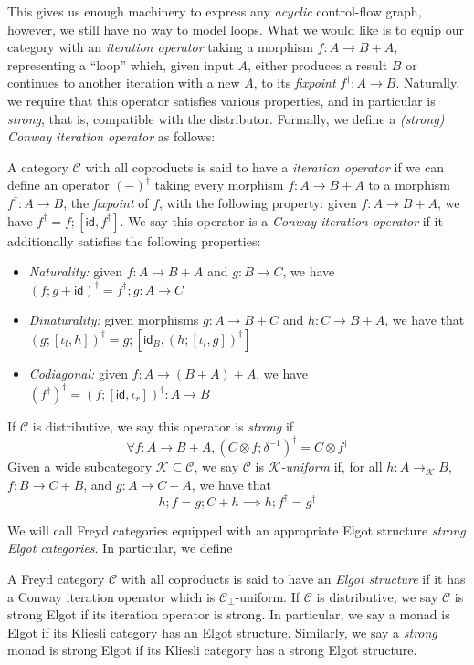 \documentclass[acmsmall,screen,review]{acmart}
\newcommand{\mc}[1]{\ensuremath{\mathcal{#1}}}
\newcommand{\ms}[1]{\ensuremath{\mathsf{#1}}}
\begin{document}
This gives us enough machinery to express any \emph{acyclic} control-flow graph, however, we still
have no way to model loops. What we would like is to equip our category with an \emph{iteration
operator} taking a morphism $f: A \to B + A$, representing a ``loop'' which, given input $A$, either
produces a result $B$ or continues to another iteration with a new $A$, to its \emph{fixpoint}
$f^\dagger: A \to B$. Naturally, we require that this operator satisfies various properties, and in
particular is \emph{strong}, that is, compatible with the distributor. Formally, we define a
\emph{(strong) Conway iteration operator} as follows:
\begin{definition}
  A category $\mc{C}$ with all coproducts is said to have a \emph{iteration operator} if we can
  define an operator $(-)^\dagger$ taking every morphism $f : A \to B + A$ to a morphism $f^\dagger
  : A \to B$, the \emph{fixpoint} of $f$, with the following property: given $f : A \to B + A$, we
  have $f^\dagger = f;[\ms{id}, f^\dagger]$. We say this operator is a \emph{Conway iteration
  operator} if it additionally satisfies the following properties:
  \begin{itemize}
    \item \emph{Naturality:} given $f : A \to B + A$ and $g : B \to C$, we have
      $
      (f;g + \ms{id})^\dagger = f^\dagger;g : A \to C
      $
    \item \emph{Dinaturality:} given morphisms $g : A \to B + C$ and $h : C \to B + A$, we have that
      $
      (g ; [\iota_l, h])^\dagger = g ; [\ms{id}_B, (h ; [\iota_l, g])^\dagger]
      $
    \item \emph{Codiagonal:} given $f : A \to (B + A) + A$, we have
      $
      (f^\dagger)^\dagger = (f;[\ms{id}, \iota_r])^\dagger : A \to B
      $
  \end{itemize}
  If $\mc{C}$ is distributive, we say this operator is \emph{strong} if
  $$
  \forall f: A \to B + A, (C \otimes f ; \delta^{-1})^\dagger = C \otimes f^\dagger
  $$
  Given a wide subcategory $\mc{K} \subseteq \mc{C}$, we say $\mc{C}$ is \emph{\mc{K}-uniform} if,
  for all $h : A \to_{\mc{K}} B$, $f : B \to C + B$, and $g : A \to C + A$, we have that
  $$
  h ; f = g ; C + h \implies h ; f^\dagger = g^\dagger 
  $$
\end{definition}
We will call Freyd categories equipped with an appropriate Elgot structure \emph{strong Elgot
categories}. In particular, we define
\begin{definition}
  A Freyd category $\mc{C}$ with all coproducts is said to have an \emph{Elgot structure} if it has
  a Conway iteration operator which is $\mc{C}_\bot$-uniform. If $\mc{C}$ is distributive, we say
  $\mc{C}$ is strong Elgot if its iteration operator is strong. In particular, we say a monad is
  Elgot if its Kliesli category has an Elgot structure. Similarly, we say a \emph{strong} monad is
  strong Elgot if its Kliesli category has a strong Elgot structure.
\end{definition}
\end{document}
